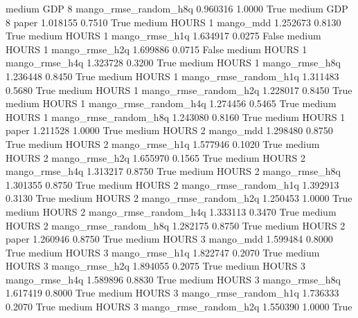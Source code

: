     medium      GDP                 8 mango_rmse_random_h8q   0.960316      1.0000    True
    medium      GDP                 8                 paper   1.018155      0.7510    True
    medium    HOURS                 1             mango_mdd   1.252673      0.8130    True
    medium    HOURS                 1        mango_rmse_h1q   1.634917      0.0275   False
    medium    HOURS                 1        mango_rmse_h2q   1.699886      0.0715   False
    medium    HOURS                 1        mango_rmse_h4q   1.323728      0.3200    True
    medium    HOURS                 1        mango_rmse_h8q   1.236448      0.8450    True
    medium    HOURS                 1 mango_rmse_random_h1q   1.311483      0.5680    True
    medium    HOURS                 1 mango_rmse_random_h2q   1.228017      0.8450    True
    medium    HOURS                 1 mango_rmse_random_h4q   1.274456      0.5465    True
    medium    HOURS                 1 mango_rmse_random_h8q   1.243080      0.8160    True
    medium    HOURS                 1                 paper   1.211528      1.0000    True
    medium    HOURS                 2             mango_mdd   1.298480      0.8750    True
    medium    HOURS                 2        mango_rmse_h1q   1.577946      0.1020    True
    medium    HOURS                 2        mango_rmse_h2q   1.655970      0.1565    True
    medium    HOURS                 2        mango_rmse_h4q   1.313217      0.8750    True
    medium    HOURS                 2        mango_rmse_h8q   1.301355      0.8750    True
    medium    HOURS                 2 mango_rmse_random_h1q   1.392913      0.3130    True
    medium    HOURS                 2 mango_rmse_random_h2q   1.250453      1.0000    True
    medium    HOURS                 2 mango_rmse_random_h4q   1.333113      0.3470    True
    medium    HOURS                 2 mango_rmse_random_h8q   1.282175      0.8750    True
    medium    HOURS                 2                 paper   1.260946      0.8750    True
    medium    HOURS                 3             mango_mdd   1.599484      0.8000    True
    medium    HOURS                 3        mango_rmse_h1q   1.822747      0.2070    True
    medium    HOURS                 3        mango_rmse_h2q   1.894055      0.2075    True
    medium    HOURS                 3        mango_rmse_h4q   1.589896      0.8830    True
    medium    HOURS                 3        mango_rmse_h8q   1.617419      0.8000    True
    medium    HOURS                 3 mango_rmse_random_h1q   1.736333      0.2070    True
    medium    HOURS                 3 mango_rmse_random_h2q   1.550390      1.0000    True
